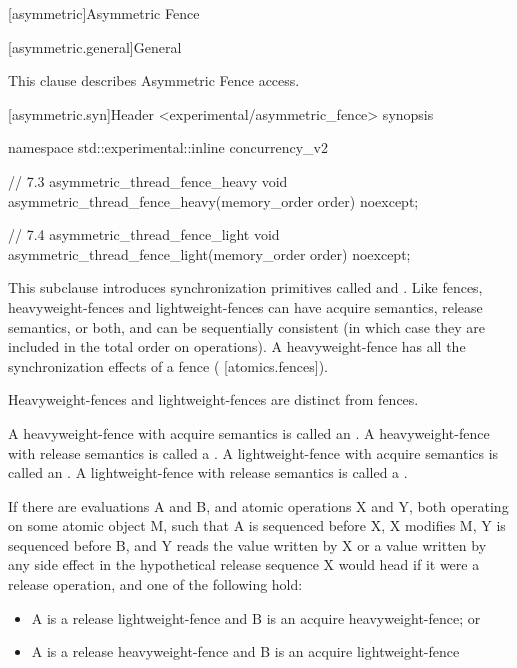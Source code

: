 
[asymmetric]{Asymmetric Fence}

[asymmetric.general]{General}

This clause describes Asymmetric Fence access. 


[asymmetric.syn]{Header <experimental/asymmetric_fence> synopsis}


\begin{codeblock}
namespace std::experimental::inline concurrency_v2 {

// 7.3 asymmetric_thread_fence_heavy
void asymmetric_thread_fence_heavy(memory_order order) noexcept;

// 7.4 asymmetric_thread_fence_light
void asymmetric_thread_fence_light(memory_order order) noexcept;
}
\end{codeblock}

\pnum

This subclause introduces synchronization primitives called  and
. Like fences, heavyweight-fences and lightweight-fences can have acquire
semantics, release semantics, or both, and can be sequentially consistent (in which case they
are included in the total order  on  operations).
A heavyweight-fence has all the
synchronization effects of a fence ( [atomics.fences]). \begin{note}  Heavyweight-fences and
lightweight-fences are distinct from fences. \end{note}

\pnum
A heavyweight-fence with acquire semantics is called an . A
heavyweight-fence with release semantics is called a . A
lightweight-fence with acquire semantics is called an . A
lightweight-fence with release semantics is called a .

\pnum
If there are evaluations A and B, and atomic operations X and Y, both operating on some atomic
object M, such that A is sequenced before X, X modifies M, Y is sequenced before B, and Y
reads the value written by X or a value written by any side effect in the hypothetical release
sequence X would head if it were a release operation, and one of the following hold:
\begin{itemize}
    \item  A is a release lightweight-fence and B is an acquire heavyweight-fence; or
\item  A is a release heavyweight-fence and B is an acquire lightweight-fence
\end{itemize}

